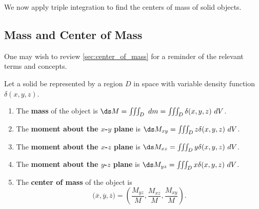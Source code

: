 We now apply triple integration to find the centers of mass of solid objects.

\subsection*{Mass and Center of Mass}

One may wish to review \autoref{sec:center_of_mass} for a reminder of the relevant terms and concepts. 

{Let a solid be represented by a region $D$ in space with variable density function $\delta(x,y,z)$. 
\begin{enumerate}
	\item The \textbf{mass} of the object is $\ds M= \iiint_D \ dm=\iiint_D \delta(x,y,z)\ dV$.
	\item	The \textbf{moment about the $x$-$y$ plane} is $\ds M_{xy}=\iiint_D z\delta(x,y,z)\ dV$.
	\item	The \textbf{moment about the $x$-$z$ plane} is $\ds M_{xz}=\iiint_D y\delta(x,y,z)\ dV$.
	\item	The \textbf{moment about the $y$-$z$ plane} is $\ds M_{yz}=\iiint_D x\delta(x,y,z)\ dV$.
	\item The \textbf{center of mass} of the object is
	$$\big(\overline{x},\overline{y},\overline{z}\big) = \left(\frac{M_{yz}}M,\frac{M_{xz}}M,\frac{M_{xy}}M\right).$$
\end{enumerate}
}

